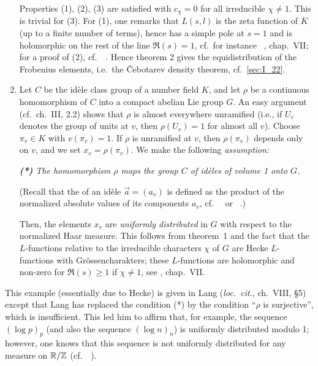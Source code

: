 \begin{subappendices}
\begin{ex}
\begin{enumerate}[series=ex_IA3]
	Properties (1), (2), (3) are satisfied with $c_\chi = 0$ for all
	irreducible $\chi \ne 1$. This is trivial for (3). For (1), one remarks
	that $L(s,l)$ is the zeta function of $K$ (up to a finite number of
	terms), hence has a simple pole at $s = 1$ and is holomorphic on the
	\dpage
	rest of the line $\Re(s) = 1$, cf.\ for instance
	\citeauthor{13}~\cite{13}, chap.\ VII; for a proof of (2), cf.\
	\citeauthor{1}~\cite[121]{1}.  Hence theorem 2 gives the
	equidistribution of the Frobenius elements, i.e.\ the \v Cebotarev
	density theorem, cf.~\ref{sec:I_22}.

\item Let $C$ be the idèle class group of a number field $K$, and let $\rho$ be
	a continuous homomorphism of $C$ into a compact abelian Lie group $G$.
	An easy argument (cf.\ ch.\ III, 2.2) shows that $\rho$ is almost
	everywhere unramified (i.e., if $U_v$ denotes the group of units at
	$v$, then $\rho(U_v) = 1$ for almost all $v$). Choose $\pi_v \in K$
	with $v(\pi_v) = 1$. If $\rho$ is unramified at $v$, then $\rho(\pi_v)$
	depends only on $v$, and we set $x_v = \rho(\pi_v)$. We make the
	following \emph{assumption:}
	\begin{displayquote}
		\slshape
		\textbf{(*)}
		The homomorphism $\rho$ maps the group $C$ of idèles of
		volume 1 onto $G$.
	\end{displayquote}
	(Recall that the  of an idèle $\vec a = (a_v)$ is
	defined as the product of the normalized absolute values of its
	components $a_v$, cf.\ \citeauthor{13}~\cite{13} or
	\citeauthor{44}~\cite{44}.)

	Then, the elements $x_v$ are \emph{uniformly distributed} in $G$ with
	respect to the normalized Haar measure. This follows from theorem~1 and
	the fact that the $L$-functions relative to the irreducible characters
	$\chi$ of $G$ are Hecke $L$-functions with Grössencharakters; these
	$L$-functions are holomorphic and non-zero for $\Re(s) \ge 1$ if $\chi
	\ne 1$, see \cite{13}, chap.\ VII.
\end{enumerate}
\end{ex}

\begin{obs}
This example (essentially due to Hecke) is given in Lang
(\emph{loc.\ cit.}, ch.\ VIII, \S 5) except that Lang has replaced the condition
(*) by the condition ``$\rho$ is surjective'', which is insufficient. This
led him to affirm that, for example, the sequence $(\log p)_p$ (and also
the sequence $(\log n)_n$) is uniformly distributed modulo 1; however,
\dpage
one knows that this sequence is not uniformly distributed for any
measure on $\mathbb{R}/\mathbb{Z}$ (cf.\ \citeauthor{22}~\cite[179-180]{22}).
\end{obs}


\end{subappendices}

